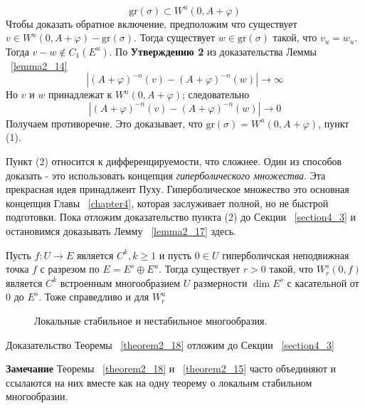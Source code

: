 \begin{demo}
$$
\mathrm{gr}(\sigma) \subset W^u(0, A + \varphi)
$$
Чтобы доказать обратное включение, предположим что существует $v \in W^u(0,A+\varphi) - \mathrm{gr}(\sigma)$. Тогда существует $w \in \mathrm{gr}(\sigma)$ такой, что $v_u=w_u$. Тогда $v-w \notin C_1(E^u)$. По  \textbf{Утверждению 2} из доказательства Леммы ~\ref{lemma2_14}
$$
|(A+\varphi)^{-n}(v)-(A+\varphi)^{-n}(w)| \rightarrow \infty
$$
Но $v$ и $w$ принадлежат к $W^u(0,A+\varphi)$; следовательно
$$
|(A+\varphi)^{-n}(v)-(A+\varphi)^{-n}(w)| \rightarrow 0
$$
Получаем противоречие. Это доказывает, что $\mathrm{gr}(\sigma)=W^u(0,A+\varphi)$, пункт (1).

Пункт (2) относится к дифференцируемости, что сложнее.  Один из способов доказать - это использовать концепция \textit{гиперболического множества}. Эта прекрасная идея принадлжеит Пуху. Гиперболическое множество это основная концепция Главы ~\ref{chapter4}, которая заслуживает полной, но не быстрой подготовки. Пока отложим доказательство пункта (2) до Секции ~\ref{section4_3} и остановимся доказывать Лемму ~\ref{lemma2_17} здесь.    
\end{demo}

\begin{theorem}
\label{theorem2_18}
Пусть $f: U \rightarrow E$ является $C^k, k \geqslant 1$ и пусть $0 \in U$ гиперболичская неподвижная точка $f$ с разрезом по $E=E^s \oplus E^u$. Тогда существует $r >0$ такой, что $W^s_r(0,f)$ является $C^k$ встроенным многообразием $U$ размерности $\dim E^s$ с касательной от $0$ до $E^s$. Тоже справедливо и для $W^u_r$  
\end{theorem}

\begin{figure}[h]
\begin{center}
\begin{minipage}{.85\textwidth}
\begin{center}
\caption{Локальные стабильное и нестабильное многообразия.}
\label{picture2_11}
\end{center}
\end{minipage}
\end{center}
\end{figure}

Доказательство Теоремы ~\ref{theorem2_18} отложим до Секции ~\ref{section4_3}

\textbf{Замечание} Теоремы ~\ref{theorem2_18} и ~\ref{theorem2_15} часто объединяют и ссылаются на них вместе как на одну теорему о локальнм стабильном многообразии. \\


